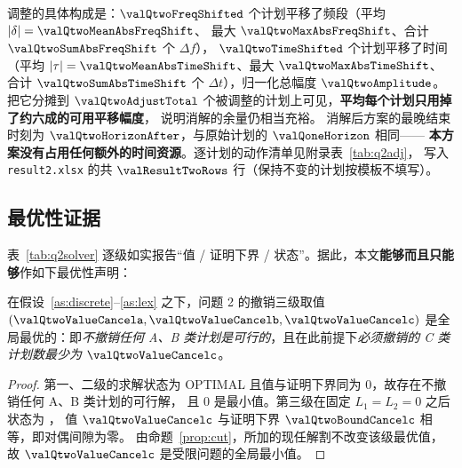 调整的具体构成是：$\valQtwoFreqShifted$ 个计划平移了频段（平均 $|\delta|=\valQtwoMeanAbsFreqShift$、
最大 $\valQtwoMaxAbsFreqShift$、合计 $\valQtwoSumAbsFreqShift$ 个 $\Delta f$），
$\valQtwoTimeShifted$ 个计划平移了时间（平均 $|\tau|=\valQtwoMeanAbsTimeShift$、最大 $\valQtwoMaxAbsTimeShift$、
合计 $\valQtwoSumAbsTimeShift$ 个 $\Delta t$），归一化总幅度 $\valQtwoAmplitude$。
把它分摊到 $\valQtwoAdjustTotal$ 个被调整的计划上可见，\textbf{平均每个计划只用掉了约六成的可用平移幅度}，
说明消解的余量仍相当充裕。
消解后方案的最晚结束时刻为 $\valQtwoHorizonAfter$，与原始计划的 $\valQoneHorizon$ 相同——
\textbf{本方案没有占用任何额外的时间资源}。逐计划的动作清单见附录表~\ref{tab:q2adj}，
写入 \nolinkurl{result2.xlsx} 的共 $\valResultTwoRows$ 行（保持不变的计划按模板不填写）。


\subsection{最优性证据}
\label{sec:q2opt}

\begin{table}[htbp]
\centering\footnotesize
\caption{问题 2 逐级求解证据。“CP-SAT 值”为报告值，“CP-SAT 下界”为求解器给出的\emph{已证明}下界；
状态 \textsf{OPTIMAL} 表示该级已闭合对偶间隙，\textsf{FEASIBLE} 表示到达时限时仍有间隙。
HiGHS 为对同一模型的独立建模；“Time limit reached”表示 HiGHS 在其时限内未能证明最优，此时其界不构成额外信息。}
\label{tab:q2solver}
\setlength{\tabcolsep}{4pt}
\resizebox{\linewidth}{!}{}
\end{table}

表~\ref{tab:q2solver} 逐级如实报告“值 / 证明下界 / 状态”。据此，本文\textbf{能够而且只能够}作如下最优性声明：

\begin{theorem}[撤销层的全局最优性]\label{thm:q2opt}
在假设~\ref{as:discrete}--\ref{as:lex} 之下，问题 2 的撤销三级取值 $(\valQtwoValueCancela,\valQtwoValueCancelb,\valQtwoValueCancelc)$
是全局最优的：即\emph{不撤销任何 A、B 类计划是可行的}，且在此前提下\emph{必须撤销的 C 类计划数最少为 $\valQtwoValueCancelc$}。
\end{theorem}
\begin{proof}
第一、二级的求解状态为 \textsf{OPTIMAL} 且值与证明下界同为 $0$，故存在不撤销任何 A、B 类计划的可行解，
且 $0$ 是最小值。第三级在固定 $L_1=L_2=0$ 之后状态为 \textsf{\valQtwoStatusCancelc}，
值 $\valQtwoValueCancelc$ 与证明下界 $\valQtwoBoundCancelc$ 相等，即对偶间隙为零。
由命题~\ref{prop:cut}，所加的现任解割不改变该级最优值，故 $\valQtwoValueCancelc$ 是受限问题的全局最小值。
\end{proof}

